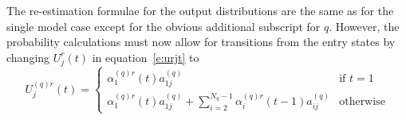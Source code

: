 The re-estimation formulae for the output distributions are the
same as for the single model case except 
for the obvious additional subscript for $q$.  However, the
probability calculations must now allow for transitions from the
entry states by changing $U^r_j(t)$ in equation~\ref{e:urjt} to
\[
  U^{(q)r}_j(t) = \left\{ \begin{array}{cl}
                              \alpha^{(q)r}_1(t) a^{(q)}_{1j}   & \mbox{if $t=1$} \\
                   \alpha^{(q)r}_1(t) a^{(q)}_{1j} + 
                   \sum^{N_q-1}_{i=2} \alpha^{(q)r}_i(t-1) 
                       a^{(q)}_{ij}         & \mbox{otherwise}
                \end{array}
        \right.
\]


